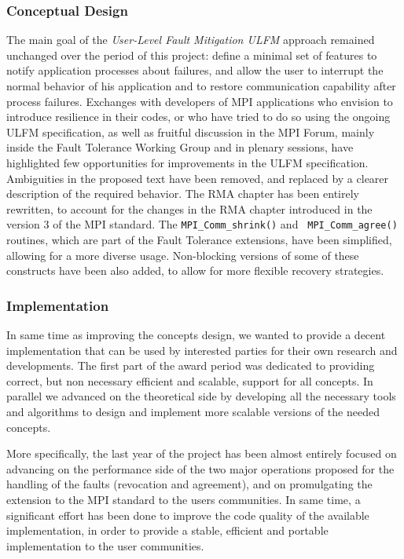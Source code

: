 \subsubsection{Conceptual Design}

The main goal of the {\em User-Level Fault Mitigation 
ULFM}\cite{Herault:2015:PSC:2807591.2807665,Bouteiller:2015:PBI:2802658.2802668,doi:10.1177/1094342013488238}
approach remained unchanged over the 
period of this project: define a minimal set of features to notify
application processes about failures, and allow the user to interrupt
the normal 
behavior of his application and to restore communication capability
after process failures. Exchanges with developers of MPI applications
who envision to introduce resilience in their codes, or who have tried
to do so using the ongoing ULFM specification, as well as fruitful
discussion in the MPI Forum, mainly inside the Fault Tolerance Working
Group and in plenary sessions, have highlighted few opportunities for
improvements in the ULFM specification. Ambiguities in the proposed
text have been removed, and replaced by a clearer description of the
required behavior. The RMA chapter has been entirely rewritten, to
account for the changes in the RMA chapter introduced in the version 3
of the MPI standard. The {\tt MPI\_Comm\_shrink()} and {\tt
MPI\_Comm\_agree()} routines, 
which are part of the Fault Tolerance extensions, have been
simplified, allowing for a more diverse usage. Non-blocking versions
of some of these constructs have been also added, to allow for more
flexible recovery strategies.

\subsubsection{Implementation}

In same time as improving the concepts design, we wanted to provide a
decent implementation that can be used by interested parties for their
own research and developments. The first part of the award period was
dedicated to providing correct, but non necessary efficient and
scalable, support for all concepts. In parallel we advanced on the
theoretical side by developing all the necessary tools and algorithms
to design and implement more scalable versions of the needed concepts.

More specifically, the last year of the project has been almost
entirely focused on advancing on the performance side of the two major
operations proposed for the handling of the faults (revocation and
agreement), and on promulgating the extension to the MPI standard to
the users communities. In same time, a significant effort has been
done to improve the code quality of the available implementation, in
order to provide a stable, efficient and portable implementation to
the user communities.

